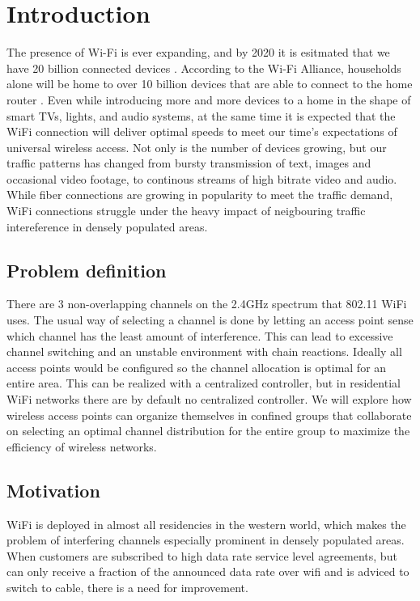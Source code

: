 \chapter{Introduction}
The presence of Wi-Fi is ever expanding, and by 2020 it is esitmated that we have 20 billion connected devices \cite{Gartner}.
According to the Wi-Fi Alliance, households alone will be home to over 10 billion devices that are able to connect to
the home router \cite{wifialliance}. 
Even while introducing more and more devices to a home in the shape of smart TVs, lights, and audio systems, at the same time
it is expected that the WiFi connection will deliver optimal speeds to meet our time's expectations of universal wireless access. 
Not only is the number of devices growing, but our traffic patterns has changed from bursty transmission of text, images and occasional
video footage, to continous streams of high bitrate video and audio. While fiber connections are growing in popularity to meet the 
traffic demand, WiFi connections struggle under the heavy impact of neigbouring traffic intereference in densely populated areas. 

\section{Problem definition}
There are 3 non-overlapping channels on the 2.4GHz spectrum that 802.11 WiFi uses. The usual way of selecting a channel is done by
letting an access point sense which channel has the least amount of interference. This can lead to excessive
channel switching and an unstable environment with chain reactions. Ideally all access points would be configured so
the channel allocation is optimal for an entire area. This can be realized with a centralized controller,
but in residential WiFi networks there are by default no centralized controller. We will explore how wireless access points can
organize themselves in confined groups that collaborate on selecting an optimal channel distribution for the entire group
to maximize the efficiency of wireless networks.

\section{Motivation}
WiFi is deployed in almost all residencies in the western world, which makes the problem of interfering channels
especially prominent in densely populated areas. When customers are subscribed to high data rate service level agreements,
but can only receive a fraction of the announced data rate over wifi and is adviced to switch to cable, there is a need for improvement. 

